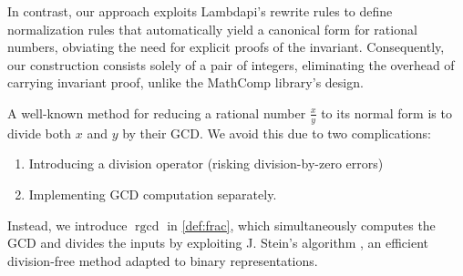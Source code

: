 In contrast, our approach exploits Lambdapi’s rewrite rules to define normalization rules that automatically yield a canonical form for rational numbers, obviating the need for explicit proofs of the invariant.
Consequently, our construction consists solely of a pair of integers, eliminating the overhead of carrying invariant proof, unlike the MathComp library’s design.

A well-known method for reducing a rational number $\frac{x}{y}$ to its normal form is to divide both $x$ and $y$ by their GCD.
We avoid this due to two complications:
\begin{enumerate}
\item Introducing a division operator (risking division-by-zero errors)
\item Implementing GCD computation separately.
\end{enumerate}
Instead, we introduce $\mathop{rgcd}$  in \cref{def:frac}, which simultaneously computes the GCD and divides the inputs by exploiting J. Stein's algorithm \cite{knuth}, an efficient division-free method adapted to binary representations.

